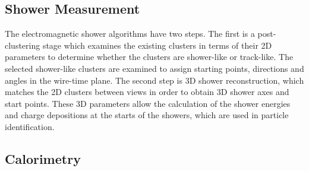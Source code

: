 

\subsection{Shower Measurement}


The electromagnetic shower algorithms have two
steps. The first is a post-clustering stage which examines the
existing clusters in terms of their 2D parameters to determine whether
the clusters are shower-like or track-like. 
The selected shower-like clusters are examined to assign starting points,
directions and angles in the wire-time plane. The second step is 
3D shower reconstruction, which
matches the 2D clusters between views in order to obtain 3D shower axes and start points.
These 3D parameters allow the calculation of the shower energies and charge
depositions at the starts of the showers, which are used in particle
identification. 


\subsection{Calorimetry}


